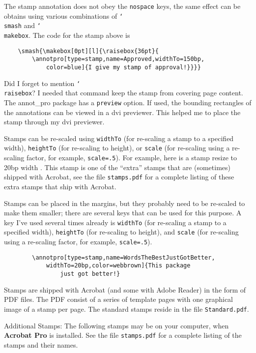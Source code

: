 \documentclass{article}
\newcommand{\cs}[1]{\texttt{\char`\\#1}}
\begin{document}
The stamp annotation does not obey the \texttt{nospace} keys, the same effect can be obtains using
various combinations of \cs{smash} and \cs{makebox}. The code for the stamp above is
\begin{verbatim}
    \smash{\makebox[0pt][l]{\raisebox{36pt}{
        \annotpro[type=stamp,name=Approved,widthTo=150bp,
            color=blue]{I give my stamp of approval!}}}}
\end{verbatim}\previewtrue
Did I forget to mention \cs{raisebox}? I needed that command keep the stamp from covering page content.
The \textsf{annot\_pro} package has a \texttt{preview} option. If used, the bounding rectangles of
the annotations can be viewed in a dvi previewer. This helped me to place the stamp through my dvi previewer.

Stamps can be re-scaled using \texttt{widthTo} (for re-scaling a stamp to a specified width), \texttt{heightTo} (for re-scaling to height),
or \texttt{scale} (for re-scaling using a re-scaling factor, for example, \texttt{scale=.5}).
For example, here is a stamp resize to 20bp width .
This stamp is one of the ``extra'' stamps that are (sometimes) shipped with Acrobat, see the file \texttt{stamps.pdf} for a complete listing
of these extra stamps that ship with Acrobat.

Stamps can be placed in the margins,
but they probably need to be re-scaled to make them smaller; there are several keys that can be used for this purpose.
A key I've used several times already is \texttt{widthTo} (for re-scaling a stamp to a specified width), \texttt{heightTo} (for re-scaling to height),
and \texttt{scale} (for re-scaling using a re-scaling factor, for example, \texttt{scale=.5}).
\begin{verbatim}
        \annotpro[type=stamp,name=WordsTheBestJustGotBetter,
            widthTo=20bp,color=webbrown]{This package
                just got better!}
\end{verbatim}

Stamps are shipped with Acrobat (and some with Adobe Reader) in the form of PDF files. The PDF consist of
a series of template pages with one graphical image of a stamp per page. The standard stamps
reside in the file \texttt{Standard.pdf}.

Additional Stamps: The following stamps may be on your computer, when \textbf{Acrobat Pro} is installed. See the
file \texttt{stamps.pdf} for a complete listing of the stamps and their names.
\end{document}
